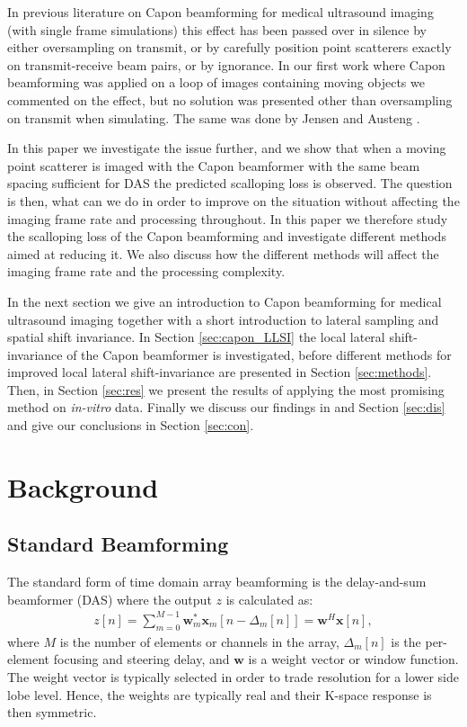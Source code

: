 \documentclass[journal]{IEEEtran}
\renewcommand{\vec}[1]{\mathbf{#1}}
\newcommand\comment[1]{\textit{{\color{red}(#1)}}}
\begin{document}
In previous literature on Capon beamforming for medical ultrasound imaging (with single frame simulations) this effect has been passed over in silence by either oversampling on transmit, or by carefully position point scatterers exactly on transmit-receive beam pairs, or by ignorance. In our first work where Capon beamforming was applied on a loop of images containing moving objects \cite{Asen2012, Asen} we commented on the effect, but no solution was presented other than oversampling on transmit when simulating. The same was done by Jensen and Austeng \cite{Jensen2012}.

In this paper we investigate the issue further, and we show that when a moving point scatterer is imaged with the Capon beamformer with the same beam spacing sufficient for DAS the predicted scalloping loss is observed. The question is then, what can we do in order to improve on the situation without affecting the imaging frame rate and processing throughout. In this paper we therefore study the scalloping loss of the Capon beamforming and investigate different methods aimed at reducing it. We also discuss how the different methods will affect the imaging frame rate and the processing complexity. 

In the next section we give an introduction to Capon beamforming for medical ultrasound imaging together with a short introduction to lateral sampling and spatial shift invariance. In Section \ref{sec:capon_LLSI} the local lateral shift-invariance of the Capon beamformer is investigated, before different methods for improved local lateral shift-invariance are presented in Section \ref{sec:methods}. Then, in Section \ref{sec:res} we present the results of applying the most promising method on \textit{in-vitro} data. Finally we discuss our findings in and Section \ref{sec:dis} and give our conclusions in Section \ref{sec:con}.



\section{Background}
\subsection{Standard Beamforming}
The standard form of time domain array beamforming is the delay-and-sum beamformer (DAS) where the output $z$ is calculated as:
\begin{align}\label{eq:das}
z[n] = \sum_{m = 0}^{M-1}\vec{w}_m^*\vec{x}_m[n - \Delta_m[n]] = \vec{w}^H\vec{x}[n],
\end{align}
where $M$ is the number of elements or channels in the array, $\Delta_m[n]$ is the per-element focusing and steering delay, and $\vec{w}$ is a weight vector or window function. The weight vector is typically selected in order to trade resolution for a lower side lobe level. Hence, the weights are typically real and their K-space response is then symmetric.
\end{document}
